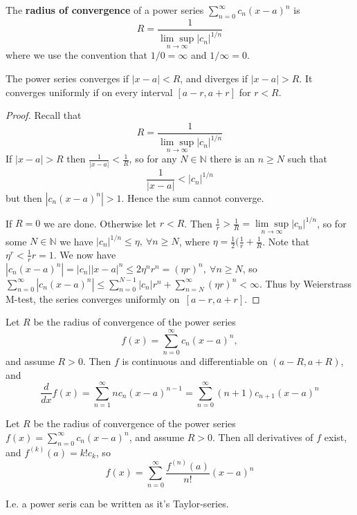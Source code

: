 \begin{defn}
    The \textbf{radius of convergence} of a power series 
    $\sum_{n=0}^{\infty}c_n(x-a)^n$ is 
    \[
        R = \frac{1}{\underset{n\to\infty}{\lim\sup} |c_n|^{1/n}}
    \]
    where we use the convention that $1/0 = \infty$ and 
    $1/\infty = 0$.
\end{defn}
\begin{prop}
    The power series converges if $|x-a| < R$, 
    and diverges if $|x-a| >R$. It converges uniformly if on 
    every interval $[a-r, a+r]$ for $r < R$.
\end{prop}
\begin{proof}
    Recall that 
    \[
        R = \frac{1}{\underset{n \to \infty}{\lim\sup}|c_n|^{1/n}}
    \]
    If $|x-a| > R$ then $\frac{1}{|x-a|} < \frac{1}{R}$, so for any 
    $N \in \mathbb N$ there is an $n \geq N$ such that 
    \[
        \frac{1}{|x-a|} < |c_n|^{1/n}
    \]
    but then $|c_n(x-a)^n| > 1$. Hence the sum cannot converge. 

    If $R = 0$ we are done. Otherwise let $r < R$. Then 
    $\frac{1}{r} > \frac{1}{R} = \underset{n\to\infty}{\lim\sup} 
    |c_n|^{1/n}$, so for some $N \in \mathbb N$ we have 
    $|c_n|^{1/n} \leq \eta, \ \forall n \geq N$, where 
    $\eta = \frac{1}{2}(\frac{1}{r} + \frac{1}{R}$. Note that 
    $\eta^r < \frac{1}{r}r = 1$. We now have 
    $|c_n(x-a)^n| = |c_n||x-a|^n \leq 2\eta^n r^n = (\eta r)^n, \ 
    \forall n \geq N$, so $\sum_{n=0}^{\infty}|c_n(x-a)^n| 
    \leq \sum_{n=0}^{N-1}|c_n|r^n + \sum_{n = N}^{\infty}(\eta r)^n 
    < \infty$. Thus by Weierstrass M-test, the series converges 
    uniformly on $[a-r, a+r]$.
\end{proof}
\begin{thm}
    Let $R$ be the radius of convergence of the power series 
    \[
        f(x) = \displaystyle\sum_{n=0}^\infty c_n(x-a)^n,
    \]
    and assume $R > 0$. Then $f$ is continuous and differentiable 
    on $(a-R, a+R)$, and 
    \[
        \frac{d}{dx} f(x) = 
        \displaystyle\sum_{n=1}^{\infty}nc_n(x-a)^{n-1} 
        = 
        \displaystyle\sum_{n=0}^{\infty}(n+1)c_{n+1}(x-a)^n
    \]
\end{thm}
\begin{thm}
    Let $R$ be the radius of convergence of the power series 
    $f(x) = \sum_{n=0}^\infty c_n(x-a)^n$, and assume $R > 0$. 
    Then all derivatives of $f$ exist, and $f^{(k)}(a) = k!c_k$, so 
    \[
        f(x) = \displaystyle\sum_{n=0}^\infty \frac{f^{(n)}(a)}{n!}
        (x-a)^n
    \]
\end{thm}
I.e. a power seris can be written as it's Taylor-series.  

